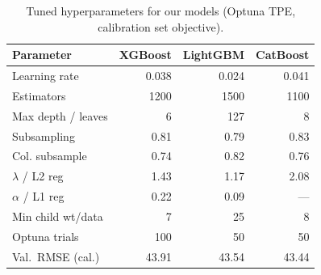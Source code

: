 \documentclass[10pt,a4paper,twocolumn]{article}
\begin{document}
\begin{table}[H]
\centering
\caption{Tuned hyperparameters for our models (Optuna TPE, calibration set objective).}
\label{tab:hyper}
\small
\begin{tabular}{@{}lrrr@{}}
\toprule
\textbf{Parameter} & \textbf{XGBoost} & \textbf{LightGBM} & \textbf{CatBoost} \\
\midrule
Learning rate      & 0.038   & 0.024   & 0.041   \\
Estimators         & 1200    & 1500    & 1100    \\
Max depth / leaves & 6       & 127     & 8       \\
Subsampling        & 0.81    & 0.79    & 0.83    \\
Col. subsample     & 0.74    & 0.82    & 0.76    \\
$\lambda$ / L2 reg & 1.43    & 1.17    & 2.08    \\
$\alpha$ / L1 reg  & 0.22    & 0.09    & ---     \\
Min child wt/data  & 7       & 25      & 8       \\
\midrule
Optuna trials      & 100     & 50      & 50      \\
Val.\ RMSE (cal.)  & 43.91   & 43.54   & 43.44   \\
\bottomrule
\end{tabular}
\end{table}
\end{document}
